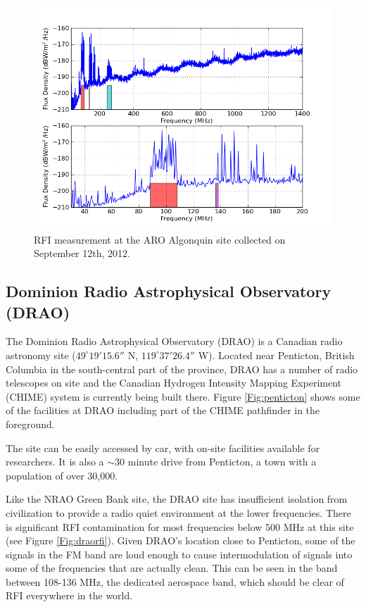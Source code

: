 \begin{figure}[tb]
\begin{center}
\includegraphics[width=0.9\linewidth]{RFI_testing/figures/ALG_bands.png}
\caption{RFI measurement at the ARO Algonquin site collected on September 12th, 2012.}
\label{Fig:arorfi}
\end{center}
\end{figure}

\subsection{Dominion Radio Astrophysical Observatory (DRAO)}

The Dominion Radio Astrophysical Observatory (DRAO) is a Canadian radio astronomy site ($49^\circ 19' 15.6''$ N, $119^\circ 37' 26.4''$ W). Located near Penticton, British Columbia in the south-central part of the province, DRAO has a number of radio telescopes on site and the Canadian Hydrogen Intensity Mapping Experiment (CHIME) system is currently being built there. Figure \ref{Fig:penticton} shows some of the facilities at DRAO including part of the CHIME pathfinder in the foreground. 

The site can be easily accessed by car, with on-site facilities available for researchers. It is also a $\sim$30 minute drive from Penticton, a town with a population of over 30,000. 

Like the NRAO Green Bank site, the DRAO site has insufficient isolation from civilization to provide a radio quiet environment at the lower frequencies. There is significant RFI contamination for most frequencies below 500 MHz at this site (see Figure \ref{Fig:draorfi}). Given DRAO's location close to Penticton, some of the signals in the FM band are loud enough to cause intermodulation of signals into some of the frequencies that are actually clean. This can be seen in the band between 108-136 MHz, the dedicated aerospace band, which should be clear of RFI everywhere in the world. 

